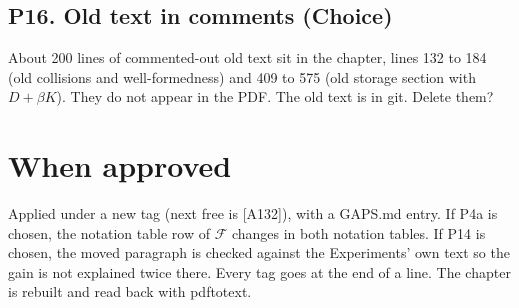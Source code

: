 \documentclass[11pt,a4paper]{article}
\newcommand{\pitem}[2]{\subsection*{P#1. #2}}
\begin{document}
\pitem{16}{Old text in comments (Choice)}
About 200 lines of commented-out old text sit in the chapter, lines 132 to
184 (old collisions and well-formedness) and 409 to 575 (old storage
section with $D+\beta K$). They do not appear in the PDF. The old text is in
git. Delete them?

\section*{When approved}
Applied under a new tag (next free is [A132]), with a GAPS.md entry. If P4a
is chosen, the notation table row of $\mathcal{F}$ changes in both notation
tables. If P14 is chosen, the moved paragraph is checked against the
Experiments' own text so the gain is not explained twice there. Every tag
goes at the end of a line. The chapter is rebuilt and read back with
pdftotext.
\end{document}
